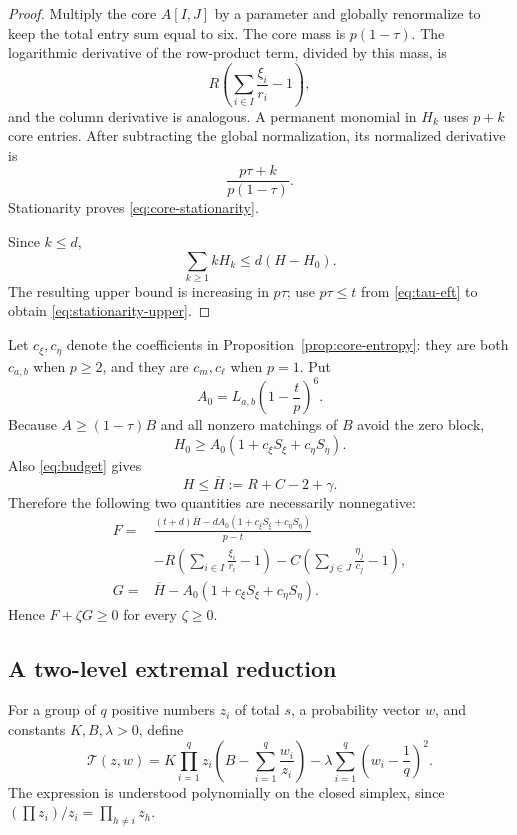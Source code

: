 \documentclass[11pt]{article}
\theoremstyle{definition}
\newcommand{\g}{\gamma}
\begin{document}
\begin{proof}
Multiply the core $A[I,J]$ by a parameter and globally renormalize to keep
the total entry sum equal to six.  The core mass is $p(1-\tau)$.  The
logarithmic derivative of the row-product term, divided by this mass, is
\[
 R\left(\sum_{i\in I}\frac{\xi_i}{r_i}-1\right),
\]
and the column derivative is analogous.  A permanent monomial in $H_k$
uses $p+k$ core entries.  After subtracting the global normalization, its
normalized derivative is
\[
 \frac{p\tau+k}{p(1-\tau)}.
\]
Stationarity proves \eqref{eq:core-stationarity}.

Since $k\le d$,
\[
 \sum_{k\ge1}kH_k\le d(H-H_0).
\]
The resulting upper bound is increasing in $p\tau$; use
$p\tau\le t$ from \eqref{eq:tau-eft} to obtain
\eqref{eq:stationarity-upper}.
\end{proof}

Let $c_\xi,c_\eta$ denote the coefficients in
Proposition~\ref{prop:core-entropy}: they are both $c_{a,b}$ when $p\ge2$,
and they are $c_m,c_\ell$ when $p=1$.  Put
\begin{equation}\label{eq:A0}
 A_0=L_{a,b}\left(1-\frac tp\right)^6.
\end{equation}
Because $A\ge(1-\tau)B$ and all nonzero matchings of $B$ avoid the zero
block,
\begin{equation}\label{eq:H0-lower}
 H_0\ge A_0(1+c_\xi S_\xi+c_\eta S_\eta).
\end{equation}
Also \eqref{eq:budget} gives
\begin{equation}\label{eq:Hbar}
 H\le\overline H:=R+C-2+\g.
\end{equation}
Therefore the following two quantities are necessarily nonnegative:
\begin{align}
 F={}&
 \frac{(t+d)\overline H-dA_0(1+c_\xi S_\xi+c_\eta S_\eta)}{p-t}
 \nonumber\\[-1mm]
 &-R\left(\sum_{i\in I}\frac{\xi_i}{r_i}-1\right)
 -C\left(\sum_{j\in J}\frac{\eta_j}{c_j}-1\right),
 \label{eq:F}\\
 G={}&\overline H-A_0(1+c_\xi S_\xi+c_\eta S_\eta).
 \label{eq:G}
\end{align}
Hence $F+\zeta G\ge0$ for every $\zeta\ge0$.

\subsection{A two-level extremal reduction}

For a group of $q$ positive numbers $z_i$ of total $s$, a probability
vector $w$, and constants $K,B,\lambda>0$, define
\begin{equation}\label{eq:side-functional}
 \mathcal T(z,w)=
 K\prod_{i=1}^qz_i
 \left(B-\sum_{i=1}^q\frac{w_i}{z_i}\right)
 -\lambda\sum_{i=1}^q\left(w_i-\frac1q\right)^2.
\end{equation}
The expression is understood polynomially on the closed simplex, since
$(\prod z_i)/z_i=\prod_{h\ne i}z_h$.
\end{document}
